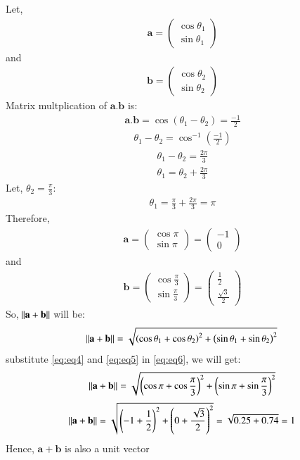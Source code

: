 \documentclass[12pt,-letter paper]{article}
\let\vec\mathbf{}
\let\vec\mathbf{}
\let\vec\mathbf{}
\providecommand{\brak}[1]{\ensuremath{\left(#1\right)}}
\newcommand{\myvec}[1]{\ensuremath{\begin{pmatrix}#1\end{pmatrix}}}
\providecommand{\brak}[1]{\ensuremath{\left(#1\right)}}
\begin{document}
\begin{enumerate}
Let, \begin{align}
\vec{a} = \myvec{\cos \theta_1 \\ \sin \theta_1}
\end{align} 
and 
\begin{align}
\vec{b} = \myvec{\cos \theta_2 \\ \sin \theta_2}
\end{align}
Matrix multplication of $\vec{a}.\vec{b}$ is:
\begin{align}
\vec{a}.\vec{b} = \cos \brak{\theta_1 -\theta_2} = \frac{-1}{2}
\end{align}
\begin{align}
\theta_1 - \theta_2 =\cos^{-1} \brak{\frac{-1}{2}}
\end{align}
\begin{align}
\theta_1 - \theta_2 = \frac{2\pi}{3}
\end{align}
\begin{align}
\theta_1 = \theta_2 +\frac{2\pi}{3}
\end{align}
Let,  $\theta_2 = \frac{\pi}{3}$:
\begin{align}
\theta_1 = \frac{\pi}{3} +\frac{2\pi}{3} = \pi
\end{align}
Therefore,
\begin{align}
\vec{a} = \myvec{\cos \pi \\ \sin \pi} = \myvec{-1 \\ 0}
\label{eq:eq4}
\end{align} and 
\begin{align}
\vec{b} = \myvec{\cos \frac{\pi}{3} \\ \sin \frac{\pi}{3}} = \myvec{\frac{1}{2} \\ \frac{\sqrt{3}}{2}} 
\label{eq:eq5}
\end{align}
 So, $\norm{\vec{a}+\vec{b}}$ will be:
 \begin{align}
 \norm{\vec{a}+\vec{b}} = \sqrt{\brak{\cos{\theta_1}+\cos{\theta_2}}^2 + \brak{\sin{\theta_1}+\sin{\theta_2}}^2}
 \label{eq:eq6}
 \end{align}
 substitute  \eqref{eq:eq4} and \eqref{eq:eq5} in \eqref{eq:eq6}, we will get:
 \begin{align}
 \norm{\vec{a}+\vec{b}} = \sqrt{\brak{\cos \pi+\cos{\frac{\pi}{3}}}^2 + \brak{\sin \pi+\sin{\frac{\pi}{3}}}^2}
 \end{align}
 \begin{align}
 \norm{\vec{a}+\vec{b}} = \sqrt{\brak{-1+\frac{1}{2}}^2 + \brak{0+\frac{\sqrt{3}}{2}}^2} = \sqrt{0.25+0.74} =1
 \end{align} 
 Hence, $\vec{a}+\vec{b}$ is also a unit vector
\end{enumerate}
\end{document}
